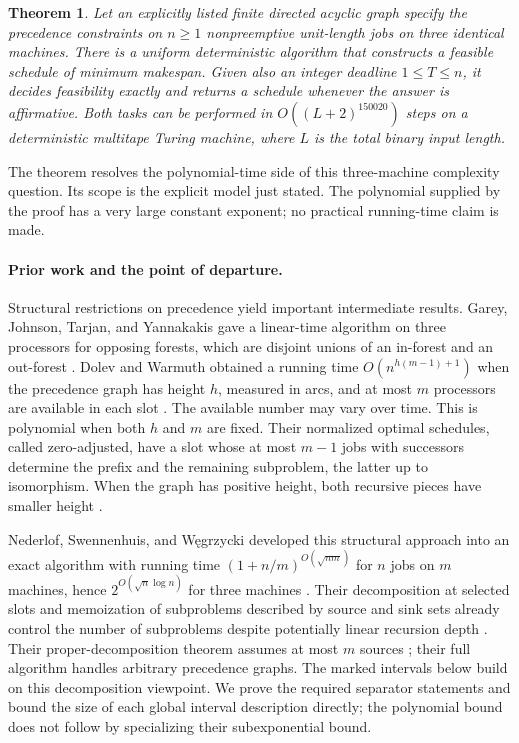 \documentclass[11pt]{article}
\numberwithin{equation}{section}
\newtheorem{theorem}{Theorem}[section]
\theoremstyle{definition}
\theoremstyle{remark}
\begin{document}
\begin{samepage}
\begin{theorem}\label{thm:main}
Let an explicitly listed finite directed acyclic graph specify the
precedence constraints on \(n\ge1\) nonpreemptive unit-length jobs
on three identical machines. There is a uniform deterministic algorithm
that constructs a feasible schedule of minimum makespan.
Given also an integer deadline \(1\le T\le n\), it decides feasibility
exactly and returns a schedule whenever the answer is affirmative.
Both tasks can be performed in
\(O((L+2)^{150020})\) steps on a deterministic multitape Turing machine,
where \(L\) is the total binary input length.
\end{theorem}
\end{samepage}

The theorem resolves the polynomial-time side of this three-machine
complexity question. Its scope is the explicit model just stated.
The polynomial supplied by the proof has a very large constant exponent;
no practical running-time claim is made.

\paragraph{Prior work and the point of departure.}
Structural restrictions on precedence yield important intermediate
results. Garey, Johnson, Tarjan, and Yannakakis gave a linear-time
algorithm on three processors for opposing forests, which are disjoint
unions of an in-forest and an out-forest
\citep[Section~4]{GareyJohnsonTarjanYannakakis1983}.
Dolev and Warmuth obtained a running time
\(O(n^{h(m-1)+1})\) when the precedence graph has height \(h\), measured
in arcs, and at most \(m\) processors are available in each slot
\citep[Theorem~3]{DW1984}. The available number may vary over time.
This is polynomial when both \(h\) and \(m\) are fixed.
Their normalized optimal schedules, called zero-adjusted, have a slot
whose at most \(m-1\) jobs with successors determine the prefix and the
remaining subproblem, the latter up to isomorphism. When the graph has positive
height, both recursive pieces have smaller height
\citep[Theorem~2]{DW1984}.

Nederlof, Swennenhuis, and Węgrzycki developed this structural approach
into an exact algorithm with running
time \((1+n/m)^{O(\sqrt{nm})}\) for \(n\) jobs on \(m\) machines, hence
\(2^{O(\sqrt n\log n)}\) for three machines
\citep[Theorem~1.1]{NSW2025}.
Their decomposition at selected slots and memoization of subproblems
described by source and sink sets already control the number of
subproblems despite potentially linear recursion depth
\citep[Sections~5--6]{NSW2025}. Their proper-decomposition
theorem assumes at most \(m\) sources
\citep[Definition~1 and Theorem~3.1]{NSW2025}; their full algorithm
handles arbitrary precedence graphs. The marked intervals below build on
this decomposition viewpoint. We prove the required separator statements
and bound the size of each global interval description directly; the
polynomial bound does not follow by specializing their subexponential bound.
\end{document}

